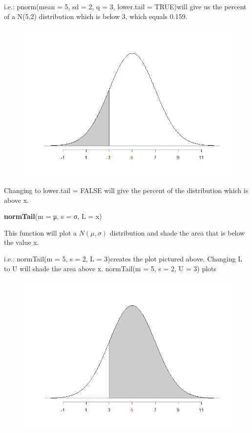 \documentclass[
]{report}
\newenvironment{Shaded}{\begin{snugshade}}{\end{snugshade}}
\newcommand{\DataTypeTok}[1]{\textcolor[rgb]{0.13,0.29,0.53}{#1}}
\newcommand{\KeywordTok}[1]{\textcolor[rgb]{0.13,0.29,0.53}{\textbf{#1}}}
\newcommand{\NormalTok}[1]{#1}
\begin{document}
i.e.: pnorm(mean = 5, sd = 2, q = 3, lower.tail = TRUE)will give us the percent of a N(5,2) distribution which is below 3, which equals 0.159.

\begin{figure}

{\centering \includegraphics[width=0.6\linewidth]{images/Norm_lessthan_3} 

}

\end{figure}

Changing to lower.tail = FALSE will give the percent of the distribution which is above x.

\begin{Shaded}
\begin{Highlighting}[]
\KeywordTok{normTail}\NormalTok{(}\DataTypeTok{m =}\NormalTok{ μ, }\DataTypeTok{s =}\NormalTok{ σ, }\DataTypeTok{L =}\NormalTok{ x)}
\end{Highlighting}
\end{Shaded}

This function will plot a \(N(\mu, \sigma)\) distribution and shade the area that is below the value x.

i.e.: normTail(m = 5, s = 2, L = 3)creates the plot pictured above.
Changing L to U will shade the area above x. normTail(m = 5, s = 2, U = 3) plots

\begin{figure}

{\centering \includegraphics[width=0.6\linewidth]{images/Norm_greaterthan_3} 

}

\end{figure}
\end{document}
